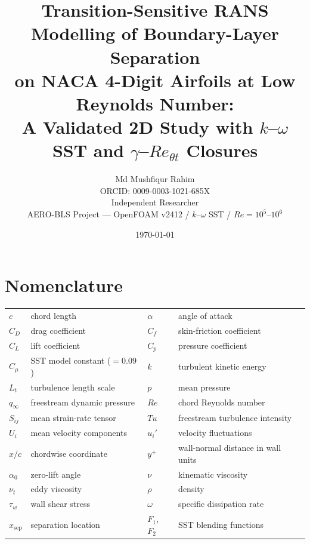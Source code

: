 \documentclass[11pt,a4paper]{article}
\title{\textbf{Transition-Sensitive RANS Modelling of Boundary-Layer Separation\\ on NACA 4-Digit Airfoils at Low Reynolds Number:\\ A Validated 2D Study with $k$--$\omega$ SST and $\gamma$--$Re_{\theta t}$ Closures}}
\author{%
  Md Mushfiqur Rahim\\
  \small ORCID: 0009-0003-1021-685X\\
  \small Independent Researcher\\
  \small AERO-BLS Project --- OpenFOAM v2412 / $k$--$\omega$ SST / $Re=10^5$--$10^6$%
}
\date{\today}
\begin{document}
\maketitle

\section*{Nomenclature}
\begin{tabular}{@{}ll@{\hspace{2.5cm}}ll@{}}
  $c$ & chord length & $\alpha$ & angle of attack \\
  $C_D$ & drag coefficient & $C_f$ & skin-friction coefficient \\
  $C_L$ & lift coefficient & $C_p$ & pressure coefficient \\
  $C_\mu$ & SST model constant ($=0.09$) & $k$ & turbulent kinetic energy \\
  $L_t$ & turbulence length scale & $p$ & mean pressure \\
  $q_\infty$ & freestream dynamic pressure & $Re$ & chord Reynolds number \\
  $S_{ij}$ & mean strain-rate tensor & $Tu$ & freestream turbulence intensity \\
  $U_i$ & mean velocity components & $u_i'$ & velocity fluctuations \\
  $x/c$ & chordwise coordinate & $y^+$ & wall-normal distance in wall units \\
  $\alpha_0$ & zero-lift angle & $\nu$ & kinematic viscosity \\
  $\nu_t$ & eddy viscosity & $\rho$ & density \\
  $\tau_w$ & wall shear stress & $\omega$ & specific dissipation rate \\
  $x_{\mathrm{sep}}$ & separation location & $F_1$, $F_2$ & SST blending functions \\
\end{tabular}
\vspace{1em}
\end{document}
